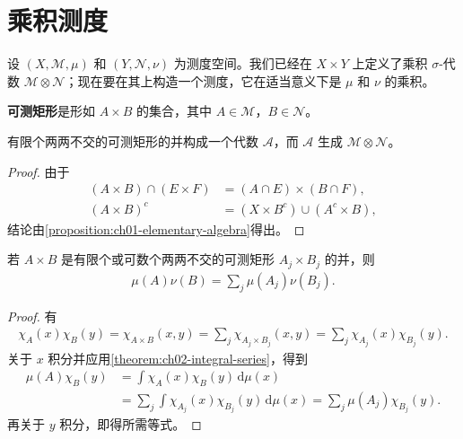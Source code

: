 \documentclass[../../main.tex]{subfiles}%
\begin{document}
\section{乘积测度}\label{section:ch02-product-measures}
设 $(X,\mathscr{M},\mu)$ 和 $(Y,\mathscr{N},\nu)$ 为测度空间。我们已经在 $X\times Y$ 上定义了乘积 $\sigma$-代数 $\mathscr{M}\otimes\mathscr{N}$；现在要在其上构造一个测度，它在适当意义下是 $\mu$ 和 $\nu$ 的乘积。
\begin{definition}[可测矩形]\label{definition:ch02-measurable-rectangle}
\textbf{可测矩形}是形如 $A\times B$ 的集合，其中 $A\in\mathscr{M}$，$B\in\mathscr{N}$。
\end{definition}
\begin{proposition}\label{proposition:ch02-rectangle-algebra}
有限个两两不交的可测矩形的并构成一个代数 $\mathscr{A}$，而 $\mathscr{A}$ 生成 $\mathscr{M}\otimes\mathscr{N}$。
\end{proposition}
\begin{proof}
由于
\begin{align*}
(A\times B)\cap(E\times F)&=(A\cap E)\times(B\cap F),\\
(A\times B)^c&=(X\times B^c)\cup(A^c\times B),
\end{align*}
结论由\cref{proposition:ch01-elementary-algebra}得出。
\end{proof}
\begin{proposition}\label{proposition:ch02-disjoint-rectangle-product}
若 $A\times B$ 是有限个或可数个两两不交的可测矩形 $A_j\times B_j$ 的并，则
\begin{align*}
\mu(A)\nu(B)=\sum_j\mu(A_j)\nu(B_j).
\end{align*}
\end{proposition}
\begin{proof}
有
\begin{align*}
\chi_A(x)\chi_B(y)=\chi_{A\times B}(x,y)
=\sum_j\chi_{A_j\times B_j}(x,y)=\sum_j\chi_{A_j}(x)\chi_{B_j}(y).
\end{align*}
关于 $x$ 积分并应用\cref{theorem:ch02-integral-series}，得到
\begin{align*}
\mu(A)\chi_B(y)
&=\int\chi_A(x)\chi_B(y)\,\mathrm{d}\mu(x)\\
&=\sum_j\int\chi_{A_j}(x)\chi_{B_j}(y)\,\mathrm{d}\mu(x)
=\sum_j\mu(A_j)\chi_{B_j}(y).
\end{align*}
再关于 $y$ 积分，即得所需等式。
\end{proof}
\end{document}
